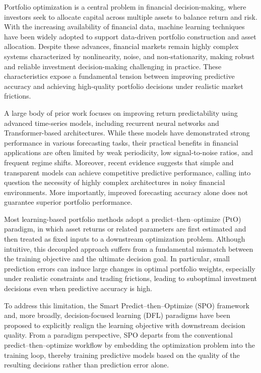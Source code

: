 \documentclass[review]{elsarticle}
\begin{document}
Portfolio optimization is a central problem in financial decision-making, where
investors seek to allocate capital across multiple assets to balance return and
risk. With the increasing availability of financial data, machine learning
techniques have been widely adopted to support data-driven portfolio
construction and asset allocation. Despite these advances, financial markets remain highly complex systems
characterized by nonlinearity, noise, and non-stationarity, making robust and
reliable investment decision-making challenging in practice.
These characteristics expose a fundamental tension between improving
predictive accuracy and achieving high-quality portfolio decisions under realistic market frictions.

A large body of prior work focuses on improving return predictability using
advanced time-series models, including recurrent neural networks and
Transformer-based architectures. While these models have demonstrated strong
performance in various forecasting tasks, their practical benefits in financial
applications are often limited by weak periodicity, low signal-to-noise ratios,
and frequent regime shifts. Moreover, recent evidence suggests that simple and
transparent models can achieve competitive predictive performance, calling into
question the necessity of highly complex architectures in noisy financial
environments. More importantly, improved forecasting accuracy alone does not
guarantee superior portfolio performance.

Most learning-based portfolio methods adopt a predict--then--optimize (PtO)
paradigm, in which asset returns or related parameters are first estimated and
then treated as fixed inputs to a downstream optimization problem. Although
intuitive, this decoupled approach suffers from a fundamental mismatch between
the training objective and the ultimate decision goal. In particular, small
prediction errors can induce large changes in optimal portfolio weights,
especially under realistic constraints and trading frictions, leading to
suboptimal investment decisions even when predictive accuracy is high.

To address this limitation, the Smart Predict--then--Optimize (SPO) framework
and, more broadly, decision-focused learning (DFL) paradigms have been proposed
to explicitly realign the learning objective with downstream decision quality.
From a paradigm perspective, SPO departs from the conventional
predict--then--optimize workflow by embedding the optimization problem into the
training loop, thereby training predictive models based on the quality of the
resulting decisions rather than prediction error alone.
\end{document}
